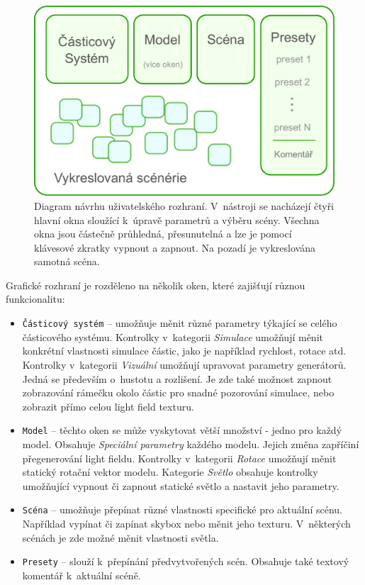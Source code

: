\begin{figure}[H]
	\centering
		\includegraphics[width=1.0\textwidth]{obrazky-figures/uimockup.pdf}
	\caption{Diagram návrhu uživatelského rozhraní. V~nástroji se nacházejí čtyři hlavní okna sloužící k~úpravě parametrů a výběru scény. Všechna okna jsou částečně průhledná, přesunutelná a lze je pomocí klávesové zkratky vypnout a zapnout. Na pozadí je vykreslována samotná scéna.}
	\label{fig:mockup_gui}
\end{figure}

Grafické rozhraní je rozděleno na několik oken, které zajišťují různou funkcionalitu: 
\begin{itemize}
    \item \texttt{Částicový systém} -- umožňuje měnit různé parametry týkající se celého částicového systému. Kontrolky v~kategorii \emph{Simulace} umožňují měnit konkrétní vlastnosti simulace částic, jako je například rychlost, rotace atd. Kontrolky v~kategorii \emph{Vizuální} umožňují upravovat parametry generátorů. Jedná se především o~hustotu a rozlišení. Je zde také možnost zapnout zobrazování rámečku okolo částic pro snadné pozorování simulace, nebo zobrazit přímo celou light field texturu.
    \item \texttt{Model} -- těchto oken se může vyskytovat větší množství - jedno pro každý model. Obsahuje \emph{Speciální parametry} každého modelu. Jejich změna zapříčiní přegenerování light fieldu. Kontrolky v~kategorii \emph{Rotace} umožňují měnit statický rotační vektor modelu. Kategorie \emph{Světlo} obsahuje kontrolky umožňující vypnout či zapnout statické světlo a nastavit jeho parametry.
    \item \texttt{Scéna} -- umožňuje přepínat různé vlastnosti specifické pro aktuální scénu. Například vypínat či zapínat skybox nebo měnit jeho texturu. V~některých scénách je zde možné měnit vlastnosti světla.
    \item \texttt{Presety} -- slouží k~přepínání předvytvořených scén. Obsahuje také textový komentář k~aktuální scéně.
\end{itemize}

